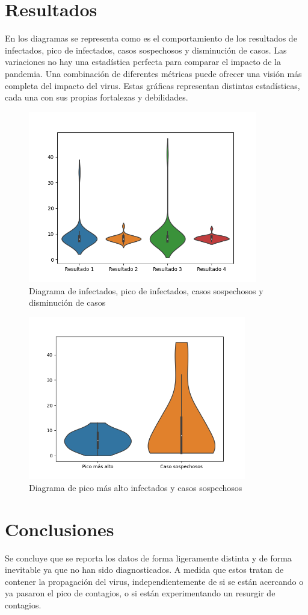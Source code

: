 \documentclass{article}
\begin{document}
\section{Resultados}\label{res}
En los diagramas se representa como es el comportamiento de los resultados de infectados, pico de infectados, casos sospechosos y disminución de casos. Las variaciones no hay una estadística perfecta para comparar el impacto de la pandemia. Una combinación de diferentes métricas puede ofrecer una visión más completa del impacto del virus. Estas gráficas representan distintas estadísticas, cada una con sus propias fortalezas y debilidades.

\newpage
\begin{figure}
    \centering
    \includegraphics[width=100mm]{Figure_1.png}
    \caption{Diagrama de infectados, pico de infectados, casos sospechosos y disminución de casos}
    \label{figure}
\end{figure}

\begin{figure}
    \centering
    \includegraphics[width=95mm]{Figure_2.png}
    \caption{Diagrama de pico más alto infectados y casos sospechosos}
    \label{figure}
\end{figure}

\section{Conclusiones}
Se concluye que se reporta los datos de forma ligeramente distinta y de forma inevitable ya que no han sido diagnosticados. A medida que estos tratan de contener la propagación del virus, independientemente de si se están acercando o ya pasaron el pico de contagios, o si están experimentando un resurgir de contagios.





\cite{elisa1}
\cite{2}
\end{document}
